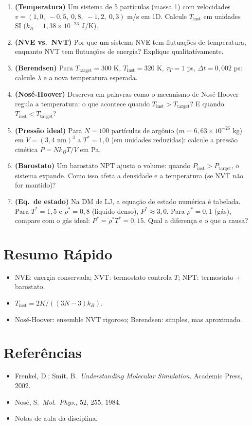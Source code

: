 \documentclass[12pt,a4paper]{article}
\begin{document}
\begin{enumerate}
  \item \textbf{(Temperatura)} Um sistema de 5 part\'iculas (massa 1) com velocidades $v = (1{,}0,\;-0{,}5,\;0{,}8,\;-1{,}2,\;0{,}3)$ m/s em 1D. Calcule $T_\text{inst}$ em unidades SI ($k_B = 1{,}38\times10^{-23}$ J/K).
  
  \item \textbf{(NVE vs.\ NVT)} Por que um sistema NVE tem flutua\c{c}\~oes de temperatura, enquanto NVT tem flutua\c{c}\~oes de energia? Explique qualitat\'ivamente.
  
  \item \textbf{(Berendsen)} Para $T_\text{target}=300$ K, $T_\text{inst}=320$ K, $\tau_T=1$ ps, $\Delta t=0{,}002$ ps: calcule $\lambda$ e a nova temperatura esperada.
  
  \item \textbf{(Nos\'e-Hoover)} Descreva em palavras como o mecanismo de Nos\'e-Hoover regula a temperatura: o que acontece quando $T_\text{inst} > T_\text{target}$? E quando $T_\text{inst} < T_\text{target}$?
  
  \item \textbf{(Press\~ao ideal)} Para $N=100$ part\'iculas de argônio ($m=6{,}63\times10^{-26}$ kg) em $V=(3{,}4\text{ nm})^3$ a $T^*=1{,}0$ (em unidades reduzidas): calcule a press\~ao cin\'etica $P = Nk_BT/V$ em Pa.
  
  \item \textbf{(Barostato)} Um barostato NPT ajusta o volume: quando $P_\text{inst} > P_\text{target}$, o sistema expande. Como isso afeta a densidade e a temperatura (se NVT n\~ao for mantido)?
  
  \item \textbf{(Eq.\ de estado)} Na DM de LJ, a equa\c{c}\~ao de estado num\'erica \'e tabelada. Para $T^*=1{,}5$ e $\rho^*=0{,}8$ (l\'iquido denso), $P^*\approx3{,}0$. Para $\rho^*=0{,}1$ (g\'as), compare com o g\'as ideal: $P^* = \rho^* T^* = 0{,}15$. Qual a diferen\c{c}a e o que a causa?
\end{enumerate}

\section*{Resumo R\'apido}
\begin{itemize}
  \item NVE: energia conservada; NVT: termostato controla $T$; NPT: termostato + barostato.
  \item $T_\text{inst} = 2K/((3N-3)k_B)$.
  \item Nos\'e-Hoover: ensemble NVT rigoroso; Berendsen: simples, mas aproximado.
\end{itemize}

\section*{Refer\^encias}
\begin{itemize}
  \item Frenkel, D.; Smit, B.\ \textit{Understanding Molecular Simulation}. Academic Press, 2002.
  \item Nos\'e, S.\ \textit{Mol.\ Phys.}, 52, 255, 1984.
  \item Notas de aula da disciplina.
\end{itemize}
\end{document}
